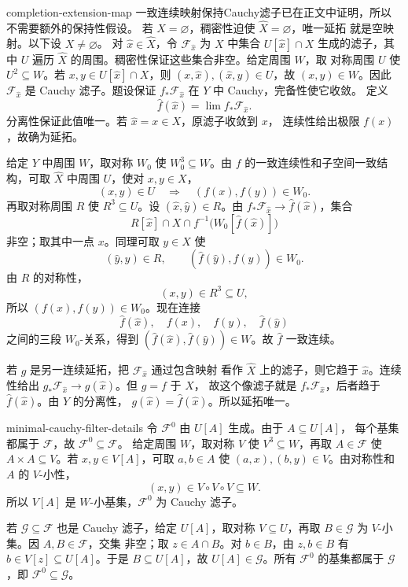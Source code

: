 \begin{solution}{completion-extension-map}
一致连续映射保持Cauchy滤子已在正文中证明，所以不需要额外的保持性假设。
若 \(X=\varnothing\)，稠密性迫使 \(\widehat X=\varnothing\)，唯一延拓
就是空映射。以下设 \(X\ne\varnothing\)。
对 \(\widehat x\in\widehat X\)，令 \(\mathcal F_{\widehat x}\) 为
\(X\) 中集合 \(U[\widehat x]\cap X\) 生成的滤子，其中 \(U\) 遍历
\(\widehat X\) 的周围。稠密性保证这些集合非空。给定周围 \(W\)，取
对称周围 \(U\) 使 \(U^2\subseteq W\)。若
\(x,y\in U[\widehat x]\cap X\)，则
\((x,\widehat x),(\widehat x,y)\in U\)，故 \((x,y)\in W\)。因此
\(\mathcal F_{\widehat x}\) 是 Cauchy 滤子。题设保证
\(f_*\mathcal F_{\widehat x}\) 在 \(Y\) 中 Cauchy，完备性使它收敛。
定义
\[
 \widehat f(\widehat x)=\lim f_*\mathcal F_{\widehat x}.
\]
分离性保证此值唯一。若 \(\widehat x=x\in X\)，原滤子收敛到 \(x\)，
连续性给出极限 \(f(x)\)，故确为延拓。

给定 \(Y\) 中周围 \(W\)，取对称 \(W_0\) 使
\(W_0^3\subseteq W\)。由 \(f\) 的一致连续性和子空间一致结构，可取
\(\widehat X\) 中周围 \(U\)，使对 \(x,y\in X\)，
\[
 (x,y)\in U\quad\Longrightarrow\quad(f(x),f(y))\in W_0.
\]
再取对称周围 \(R\) 使 \(R^3\subseteq U\)。设
\((\widehat x,\widehat y)\in R\)。由
\(f_*\mathcal F_{\widehat x}\to\widehat f(\widehat x)\)，集合
\[
 R[\widehat x]\cap X
 \cap f^{-1}\bigl(W_0[\widehat f(\widehat x)]\bigr)
\]
非空；取其中一点 \(x\)。同理可取 \(y\in X\) 使
\[
 (\widehat y,y)\in R,
 \qquad(\widehat f(\widehat y),f(y))\in W_0.
\]
由 \(R\) 的对称性，
\[
 (x,y)\in R^3\subseteq U,
\]
所以 \((f(x),f(y))\in W_0\)。现在连接
\[
 \widehat f(\widehat x),\quad f(x),\quad f(y),\quad
 \widehat f(\widehat y)
\]
之间的三段 \(W_0\)-关系，得到
\((\widehat f(\widehat x),\widehat f(\widehat y))\in W\)。故
\(\widehat f\) 一致连续。

若 \(g\) 是另一连续延拓，把 \(\mathcal F_{\widehat x}\) 通过包含映射
看作 \(\widehat X\) 上的滤子，则它趋于 \(\widehat x\)。连续性给出
\(g_*\mathcal F_{\widehat x}\to g(\widehat x)\)。但 \(g=f\) 于 \(X\)，
故这个像滤子就是 \(f_*\mathcal F_{\widehat x}\)，后者趋于
\(\widehat f(\widehat x)\)。由 \(Y\) 的分离性，
\(g(\widehat x)=\widehat f(\widehat x)\)。所以延拓唯一。
\end{solution}

\begin{solution}{minimal-cauchy-filter-details}
令 \(\mathcal F^0\) 由 \(U[A]\) 生成。由于 \(A\subseteq U[A]\)，
每个基集都属于 \(\mathcal F\)，故 \(\mathcal F^0\subseteq\mathcal F\)。
给定周围 \(W\)，取对称 \(V\) 使 \(V^3\subseteq W\)，再取
\(A\in\mathcal F\) 使 \(A\times A\subseteq V\)。若
\(x,y\in V[A]\)，可取 \(a,b\in A\) 使
\((a,x),(b,y)\in V\)。由对称性和 \(A\) 的 \(V\)-小性，
\[
 (x,y)\in V\circ V\circ V\subseteq W.
\]
所以 \(V[A]\) 是 \(W\)-小基集，\(\mathcal F^0\) 为 Cauchy 滤子。

若 \(\mathcal G\subseteq\mathcal F\) 也是 Cauchy 滤子，给定
\(U[A]\)，取对称 \(V\subseteq U\)，再取
\(B\in\mathcal G\) 为 \(V\)-小集。因 \(A,B\in\mathcal F\)，交集
非空；取 \(z\in A\cap B\)。对 \(b\in B\)，由 \(z,b\in B\) 有
\(b\in V[z]\subseteq U[A]\)。于是 \(B\subseteq U[A]\)，故
\(U[A]\in\mathcal G\)。所有 \(\mathcal F^0\) 的基集都属于
\(\mathcal G\)，即 \(\mathcal F^0\subseteq\mathcal G\)。
\end{solution}
